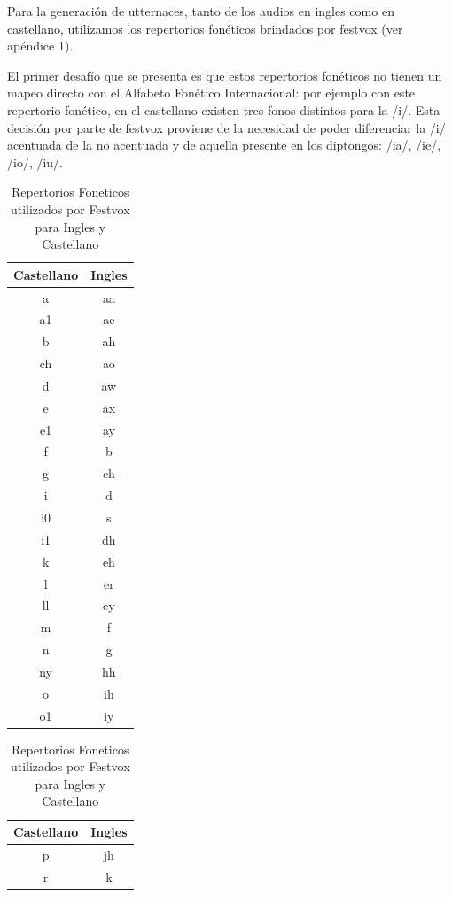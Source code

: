 
Para la generación de utternaces, tanto de los audios en ingles como en castellano, utilizamos los repertorios fonéticos brindados por festvox (ver apéndice 1).

El primer desafío que se presenta es que estos repertorios fonéticos no tienen un mapeo directo con el Alfabeto Fonético Internacional: por ejemplo con este repertorio fonético, en el castellano existen tres fonos distintos para la /i/. Esta decisión por parte de festvox proviene de la necesidad de poder diferenciar la /i/ acentuada de la no acentuada  y de aquella presente en los diptongos: /ia/, /ie/, /io/, /iu/.

\begin{table}
\centering
\caption{Repertorios Foneticos utilizados por Festvox para Ingles y Castellano}
\begin{minipage}[t]{0.3\textwidth}
\begin{tabular}[t]{cc}
\toprule
Castellano & Ingles \\
\midrule
a & aa \\ 
a1 & ae \\ 
b & ah \\ 
ch & ao \\ 
d & aw \\ 
e & ax \\ 
e1 & ay \\ 
f & b \\ 
g & ch \\ 
i & d \\ 
i0 & s \\ 
i1 & dh \\ 
k & eh \\ 
l & er \\ 
ll & ey \\ 
m & f \\ 
n & g \\ 
ny & hh \\ 
o & ih \\ 
o1 & iy \\ 
\bottomrule
\end{tabular}
\end{minipage}
\begin{minipage}[t]{0.3\textwidth}
\begin{tabular}[t]{cc}
\toprule
Castellano & Ingles \\ 
\midrule
p & jh \\ 
r & k \\ 

\end{tabular}
\end{minipage}
\end{table}
